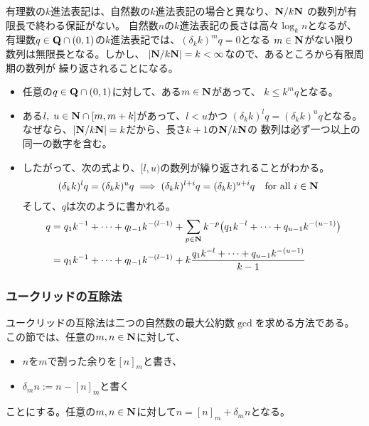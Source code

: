 	有理数の$k$進法表記は、自然数の$k$進法表記の場合と異なり、$\mathbf{N}/k\mathbf{N}$
	の数列が有限長で終わる保証がない。
	自然数$n$の$k$進法表記の長さは高々$\log_kn$となるが、
	有理数$q\in\mathbf{Q}\cap(0,1)$の$k$進法表記では、$(\delta_kk)^mq=0$となる
	$m\in\mathbf{N}$がない限り数列は無限長となる。しかし、
	$|\mathbf{N}/k\mathbf{N}|=k<\infty$なので、あるところから有限周期の数列が
	繰り返されることになる。
	\begin{itemize}\setlength{\itemsep}{-1mm} %
		\item 任意の$q\in\mathbf{Q}\cap(0,1)$に対して、ある$m\in\mathbf{N}$があって、
		$k\le k^mq$となる。
		\item ある$l,\;u\in\mathbf{N}\cap[m,m+k]$があって、$l<u$かつ
		$(\delta_kk)^lq=(\delta_kk)^uq$となる。
		なぜなら、$|\mathbf{N}/k\mathbf{N}|=k$だから、長さ$k+1$の$\mathbf{N}/k\mathbf{N}$の
		数列は必ず一つ以上の同一の数字を含む。
		\item したがって、次の式より、$[l,u)$の数列が繰り返されることがわかる。
		\begin{equation*}\begin{split}
			(\delta_kk)^lq=(\delta_kk)^uq
			&\implies (\delta_kk)^{l + i}q=(\delta_kk)^{u + i}q
			\quad\text{for all }i\in\mathbf{N}
		\end{split}\end{equation*}
		そして、$q$は次のように書かれる。
		\begin{equation*}\begin{split}
			q 
			&= q_1k^{-1} + \cdots + q_{l-1}k^{-(l-1)}
				+ \sum_{p\in\mathbf{N}}k^{-p}\bigl(q_1k^{-l} + \cdots + q_{u-1}k^{-(u-1)}\bigr) \\
			&= q_1k^{-1} + \cdots + q_{l-1}k^{-(l-1)}
				+ k\frac{q_1k^{-l} + \cdots + q_{u-1}k^{-(u-1)}}{k-1} \\
		\end{split}\end{equation*}
	\end{itemize} %
\subsubsection{ユークリッドの互除法}\label{s3:ユークリッドの互除法} %
	ユークリッドの互除法は二つの自然数の最大公約数$\gcd$を求める方法である。
	この節では、任意の$m,n\in\mathbf{N}$に対して、
	\begin{itemize}\setlength{\itemsep}{-1mm} %
		\item $n$を$m$で割った余りを$[n]_m$と書き、
		\item $\delta_mn:=n-[n]_m$と書く
	\end{itemize} %
	ことにする。任意の$m,n\in\mathbf{N}$に対して$n = [n]_m + \delta_mn$となる。

